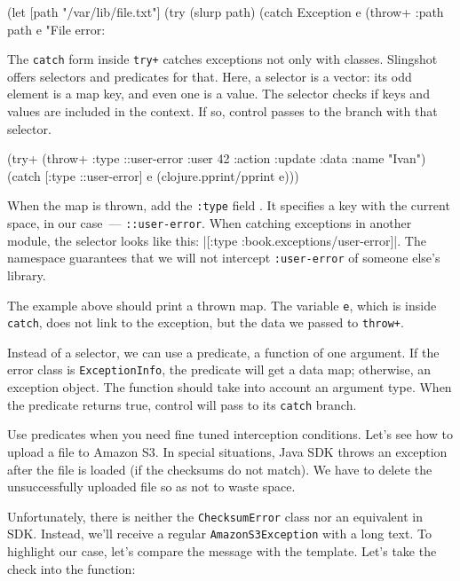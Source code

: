\else

\begin{clojure}
(let [path "/var/lib/file.txt"]
  (try
    (slurp path)
    (catch Exception e
      (throw+ {:path path} e "File error: %
\end{clojure}

\fi


The \verb|catch| form inside \verb|try+| catches exceptions not only with classes. Slingshot offers selectors and predicates for that. Here, a selector is a vector: its odd element is a map key, and even one is a value. The selector checks if keys and values are included in the context. If so, control passes to the branch with that selector.

\begin{clojure/lines}
(try+
 (throw+ {:type ::user-error
          :user 42
          :action :update
          :data {:name "Ivan"}})
 (catch [:type ::user-error] e
   (clojure.pprint/pprint e)))
\end{clojure/lines}

When the map is thrown, add the \verb|:type| field . It specifies a key with the current space, in our case~--- \verb|::user-error|.
When catching exceptions in another module, the selector looks like this: \spverb|[:type :book.exceptions/user-error]|. The namespace guarantees that we will not intercept \texttt{:user\--error} of someone else's library.

The example above should print a thrown map. The variable \verb|e|, which is inside \verb|catch|, does not link to the exception, but the data we passed to \verb|throw+|.

Instead of a selector, we can use a predicate, a function of one argument. If the error class is \verb|ExceptionInfo|, the predicate will get a data map; otherwise, an exception object. The function should take into account an argument type. When the predicate returns true, control will pass to its \verb|catch| branch.


Use predicates when you need fine tuned interception conditions. Let's see how to upload a file to Amazon S3. In special situations, Java SDK throws an exception after the file is loaded (if the checksums do not match). We have to delete the unsuccessfully uploaded file so as not to waste space.

Unfortunately, there is neither the \verb|ChecksumError| class nor an equivalent in SDK. Instead, we'll receive a regular \verb|AmazonS3Exception| with a long text. To highlight our case, let's compare the message with the template. Let's take the check into the function:

